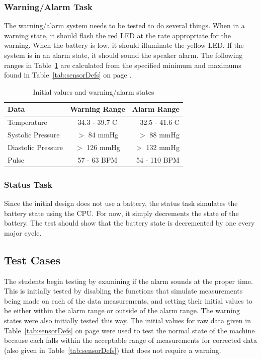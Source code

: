 \documentclass[12pt]{article} %
\begin{document}
\subsubsection{Warning/Alarm Task} 
The warning/alarm system needs to be tested to do several things.  When in a
warning state, it should flash the red LED at the rate appropriate for the
warning.  When the battery is low, it should illuminate the yellow LED.  If the
system is in an alarm state, it should sound the speaker alarm.  The following
ranges in Table~\ref{tab:ranges} are calculated from the specified minimum and
maximums found in Table~\ref{tab:sensorDefs} on page \pageref{tab:sensorDefs}.
\begin{table}[h]
	\centering
	\begin{tabular}{lcr} 
    \toprule
		Data & Warning Range & Alarm Range \\
		\midrule
		Temperature & 34.3 - 39.7 C & 32.5 - 41.6 C\\
		Systolic Pressure  & $>$ 84 mmHg & $>$ 88 mmHg\\
		Diastolic Pressure & $>$ 126 mmHg & $>$ 132 mmHg\\
		Pulse & 57 - 63 BPM & 54 - 110 BPM \\
    \bottomrule
	\end{tabular}
	\caption{Initial values and warning/alarm states}
  \label{tab:ranges}
\end{table}

\subsubsection{Status Task}
Since the initial design does not use a battery, the status task simulates the
battery state using the CPU.  For now, it simply decrements the state of the
battery.  The test should show that the battery state is decremented by one
every major cycle.

\subsection{Test Cases}

The students begin testing by examining if the alarm sounds at the proper time.
This is initially tested by disabling the functions that simulate measurements
being made on each of the data measurements, and setting their initial values
to be either within the alarm range or outside of the alarm range. The warning
states were also initially tested this way. The initial values for raw data
given in Table~\ref{tab:sensorDefs} on page \pageref{tab:sensorDefs} were used
to test the normal state of the machine because each falls within the
acceptable range of measurements for corrected data (also given in
Table~\ref{tab:sensorDefs}) that does not require a warning.
	
\end{document}

